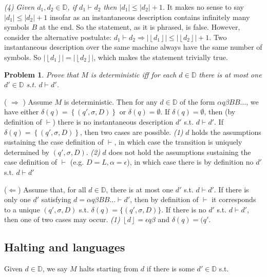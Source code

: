 \documentclass[a4paper, 12pt]{article}
\newtheorem{problem}{Problem}
\newtheorem{problem}{Problem}
\begin{document}
\textit{(4)} \textit{  Given $d_1, d_2 \in \mathbb{D}$, if $d_1 \vdash d_2$ then
$|d_1| \leq |d_2| + 1$. } It makes no sense to say $|d_1| \leq |d_2| + 1$
insofar as an instantaneous description contains infinitely many symbols $B$ at
the end. So the statement, as it is phrased, is false. However, consider the
alternative postulate: $d_1 \vdash d_2 \Rightarrow |\left\lfloor d_1
\right\rfloor| \leq | \left\lfloor d_2 \right\rfloor | + 1$. Two instantaneous
description over the same machine always have the same number of symbols. So $ |
\left\lfloor d_1 \right\rfloor| = | \left\lfloor d_2 \right\rfloor | $, which
makes the statement trivially true.

\begin{problem}
    Prove that $M$ is deterministic iff for each $d \in \mathbb{D}$ there is
    \textit{at most} one $d' \in \mathbb{D}$ s.t. $d \vdash d'$.
\end{problem}

( $\Rightarrow$ ) Assume $M$ is deterministic. Then for any $d \in \mathbb{D}$
of the form $\alpha q \beta B B \ldots$, we have either $\delta(q) = \left\{
(q', \sigma, D) \right\} $ or $\delta(q) = \emptyset$. If $\delta(q) =
\emptyset$, then (by definition of $\vdash$) there is no instantaneous description $d'$ s.t. $d \vdash d'$.
If $\delta(q) = \left\{ (q', \sigma, D) \right\} $, then two cases are possible.
\textit{(1)} $d$ holds the assumptions sustaining the case definition of
$\vdash$, in which case the transition is uniquely determined by $(q',
\sigma, D)$. \textit{(2)} $d$ does not hold the assumptions sustaining the
case definition of $\vdash$ (e.g. $D = L, \alpha = \epsilon$), in which case
there is by definition no $d'$ s.t. $d \vdash d'$

($\Leftarrow$) Assume that, for all $d \in \mathbb{D}$, there is at most one
$d'$ s.t. $d \vdash d'$. If there is only one $d'$ satisfying $d = \alpha q
\beta B B \ldots \vdash d'$, then by
definition of $\vdash$ it corresponds to a unique $(q', \sigma, D)$ s.t.
$\delta(q) = \{(q', \sigma, D)\}$. If there is no $d'$ s.t. $d \vdash d'$, then
one of two cases may occur. \textit{(1)} $\left\lfloor d \right\rfloor =
\epsilon q \beta $ and $\delta(q) = (q'$.

\subsection{Halting and languages}

Given $d \in \mathbb{D}$, we say $M$ halts starting from $d$ if there is some
$d' \in \mathbb{D}$ s.t. 
\end{document}
